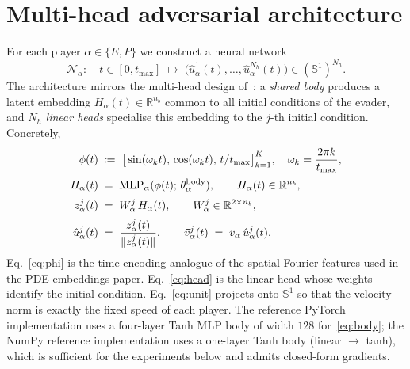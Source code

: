 \documentclass[11pt]{article}
\newcommand{\RR}{\mathbb{R}}
\begin{document}
\section{Multi-head adversarial architecture}
\label{sec:arch}
For each player $\alpha\in\{E,P\}$ we construct a neural network
\begin{equation}
\mathcal{N}_\alpha:
\quad
t\in[0,t_{\max}]
\;\longmapsto\;
\bigl(\hat{u}_\alpha^{1}(t),\dots,\hat{u}_\alpha^{N_h}(t)\bigr)
\in (\mathbb{S}^1)^{N_h}.
\end{equation}
The architecture mirrors the multi-head design
of~\citep{JimenezEmbeddings2026}: a \emph{shared body} produces a latent
embedding $H_\alpha(t)\in\RR^{n_b}$ common to all initial conditions of
the evader, and $N_h$ \emph{linear heads} specialise this embedding to
the $j$-th initial condition.  Concretely,
\begin{align}
\phi(t)
&\;\coloneqq\;
\big[\sin(\omega_k t),\,\cos(\omega_k t),\,t/t_{\max}\big]_{k=1}^{K},
\quad \omega_k = \frac{2\pi k}{t_{\max}},
\label{eq:phi}\\[2pt]
H_\alpha(t)
&\;=\;
\mathrm{MLP}_\alpha(\phi(t);\,\theta_\alpha^{\rm body}),
\qquad H_\alpha(t)\in\RR^{n_b},
\label{eq:body}\\[2pt]
z_\alpha^{j}(t)
&\;=\;
W_\alpha^{j} \, H_\alpha(t),
\qquad W_\alpha^{j}\in\RR^{2\times n_b},
\label{eq:head}\\[2pt]
\hat{u}_\alpha^{j}(t)
&\;=\;
\frac{z_\alpha^{j}(t)}{\|z_\alpha^{j}(t)\|},
\qquad
\vec{v}_\alpha^{j}(t)
\;=\;
v_\alpha\,\hat{u}_\alpha^{j}(t).
\label{eq:unit}
\end{align}
Eq.~\eqref{eq:phi} is the time-encoding analogue of the spatial Fourier
features used in the PDE embeddings paper.  Eq.~\eqref{eq:head} is the
linear head whose weights identify the initial condition.
Eq.~\eqref{eq:unit} projects onto $\mathbb{S}^1$ so that the velocity
norm is exactly the fixed speed of each player.
The reference PyTorch implementation uses a four-layer Tanh MLP body of
width $128$ for~\eqref{eq:body}; the NumPy reference implementation
uses a one-layer Tanh body (linear $\to$ tanh), which is sufficient for
the experiments below and admits closed-form gradients.

\medskip
\end{document}

